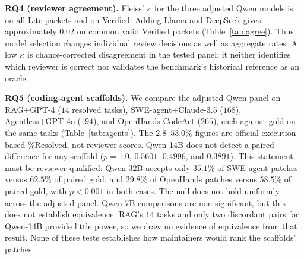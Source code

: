 \documentclass[10pt,conference]{IEEEtran}
\begin{document}
\textbf{RQ4 (reviewer agreement).} Fleiss' $\kappa$ for the three adjusted Qwen models is
\fleissAllLite{} on all Lite packets and \fleissAllVerified{} on Verified. Adding Llama and
DeepSeek gives approximately $0.02$ on common valid Verified packets
(Table~\ref{tab:agree}). Thus model selection changes individual review decisions as well
as aggregate rates. A low $\kappa$ is chance-corrected disagreement in the tested panel;
it neither identifies which reviewer is correct nor validates the benchmark's historical
reference as an oracle.

\begin{table}[t]
\centering
\caption{Inter-reviewer agreement (Fleiss $\kappa$) on common valid packets. The five-reviewer panel includes Qwen, Llama, and DeepSeek; $a/g$ denote agent/gold.}
\label{tab:agree}
\small

\end{table}





\textbf{RQ5 (coding-agent scaffolds).} We compare the adjusted Qwen panel on RAG+GPT-4
($14$ resolved tasks), SWE-agent+Claude-3.5 ($168$), Agentless+GPT-4o ($194$), and
OpenHands-CodeAct ($265$), each against gold on the same tasks (Table~\ref{tab:agents}).
The $2.8$--$53.0\%$ figures are official execution-based \%Resolved, not reviewer scores.
Qwen-14B does not detect a paired difference for any scaffold ($p=1.0$, $0.5601$,
$0.4996$, and $0.3891$). This statement must be reviewer-qualified: Qwen-32B accepts only
$35.1\%$ of SWE-agent patches versus $62.5\%$ of paired gold, and $29.8\%$ of OpenHands
patches versus $58.5\%$ of paired gold, with $p<0.001$ in both cases. The null does not
hold uniformly across the adjusted panel. Qwen-7B comparisons are non-significant, but
this does not establish equivalence. RAG's $14$ tasks and only two discordant pairs for
Qwen-14B provide little power, so we draw no evidence of equivalence from that result.
None of these tests establishes how maintainers would rank the scaffolds' patches.

\begin{table}[t]
\centering
\caption{Across four agents spanning $2.8$--$53\%$ \%Resolved on Verified, adjusted Qwen results vary by reviewer. RAP is agent acceptance; each paired $p$ compares agent and gold on the same tasks. Qwen-32B detects differences for SWE-agent and OpenHands. RAG has low power.}
\label{tab:agents}
\small

\end{table}
\end{document}
